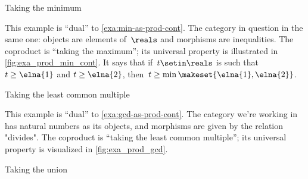 \begin{figure}[h!
    ]
    \centering
    \caption{}
    \label{fig:coprod_disunion_diagram}
\end{figure}

\begin{marginfigure}
    \centering
    \caption{Taking the minimum}
    \label{fig:exa_coprod_max_cont}
\end{marginfigure}

\begin{example}
    \label{exa:min-as-prod-cont-to-rename}
    This example is ``dual'' to \cref{exa:min-as-prod-cont}.
    The category in question in the same one: objects are elements of~$\reals$ and morphisms are inequalities.
    The coproduct is ``taking the maximum''; its universal property is illustrated in \cref{fig:exa_prod_min_cont}.
    It says that if~$t \setin \reals$ is such that~$t \geq \elna{1}$ and $t \geq \elna{2}$, then~$t \geq \min \makeset{ \elna{1}, \elna{2} }$.

\end{example}

\begin{marginfigure}
    \centering
    \caption{Taking the least common multiple}
    \label{fig:exa_coprod_lcm_cont}
\end{marginfigure}
\begin{example}
    \label{exa:lcm-as-coprod-cont}
    This example is ``dual'' to \cref{exa:gcd-as-prod-cont}.
    The category we're working in has natural numbers as its objects, and morphisms are given by the relation "divides".
    The coproduct is ``taking the least common multiple''; its universal property is visualized in \cref{fig:exa_prod_gcd}.
\end{example}

\begin{marginfigure}
    \centering
    \caption{Taking the union}
    \label{fig:exa_coprod_union_cont}
\end{marginfigure}

